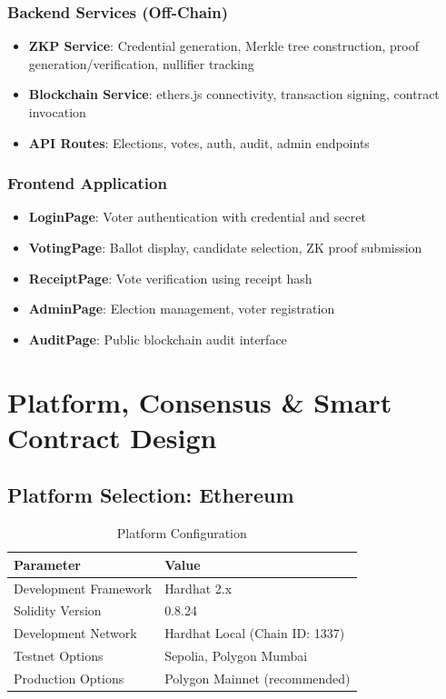\documentclass[conference]{IEEEtran}
\begin{document}
\subsubsection{Backend Services (Off-Chain)}
\begin{itemize}
    \item \textbf{ZKP Service}: Credential generation, Merkle tree construction, proof generation/verification, nullifier tracking
    \item \textbf{Blockchain Service}: ethers.js connectivity, transaction signing, contract invocation
    \item \textbf{API Routes}: Elections, votes, auth, audit, admin endpoints
\end{itemize}

\subsubsection{Frontend Application}
\begin{itemize}
    \item \textbf{LoginPage}: Voter authentication with credential and secret
    \item \textbf{VotingPage}: Ballot display, candidate selection, ZK proof submission
    \item \textbf{ReceiptPage}: Vote verification using receipt hash
    \item \textbf{AdminPage}: Election management, voter registration
    \item \textbf{AuditPage}: Public blockchain audit interface
\end{itemize}

\section{Platform, Consensus \& Smart Contract Design}

\subsection{Platform Selection: Ethereum}

\begin{table}[htbp]
\caption{Platform Configuration}
\centering
\begin{tabular}{|l|l|}
\hline
\textbf{Parameter} & \textbf{Value} \\
\hline
Development Framework & Hardhat 2.x \\
\hline
Solidity Version & 0.8.24 \\
\hline
Development Network & Hardhat Local (Chain ID: 1337) \\
\hline
Testnet Options & Sepolia, Polygon Mumbai \\
\hline
Production Options & Polygon Mainnet (recommended) \\
\hline
\end{tabular}
\end{table}
\end{document}

